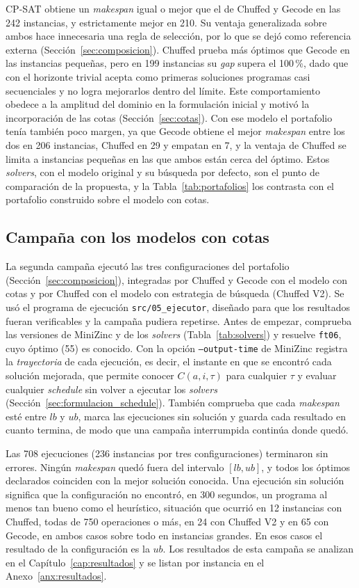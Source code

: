 CP-SAT obtiene un \textit{makespan} igual o mejor que el de Chuffed y Gecode en
las 242 instancias, y estrictamente mejor en 210. Su ventaja generalizada sobre
ambos hace innecesaria una regla de selección, por lo que se dejó como
referencia externa (Sección~\ref{sec:composicion}). Chuffed prueba más óptimos
que Gecode en las instancias pequeñas, pero en 199 instancias su \textit{gap}
supera el 100\,\%, dado que con el horizonte trivial acepta como primeras
soluciones programas casi secuenciales y no logra mejorarlos dentro del límite.
Este comportamiento obedece a la amplitud del dominio en la formulación inicial
y motivó la incorporación de las cotas (Sección~\ref{sec:cotas}). Con ese
modelo el portafolio tenía también poco margen, ya que Gecode obtiene el mejor
\textit{makespan} entre los dos en 206 instancias, Chuffed en 29 y empatan en 7,
y la ventaja de Chuffed se limita a instancias pequeñas en las que ambos están
cerca del óptimo.
Estos \textit{solvers}, con el modelo original y su búsqueda por defecto, son
el punto de comparación de la propuesta, y la Tabla~\ref{tab:portafolios} los
contrasta con el portafolio construido sobre el modelo con cotas.

\subsection{Campaña con los modelos con cotas}

La segunda campaña ejecutó las tres configuraciones del portafolio
(Sección~\ref{sec:composicion}), integradas por Chuffed y Gecode con el modelo
con cotas y por Chuffed con el modelo con estrategia de búsqueda (Chuffed V2).
Se usó el programa de ejecución \texttt{src/05\_ejecutor}, diseñado para que los
resultados fueran verificables y la campaña pudiera repetirse. Antes de
empezar, comprueba las versiones de MiniZinc y de los \textit{solvers}
(Tabla~\ref{tab:solvers}) y resuelve \texttt{ft06}, cuyo óptimo (55) es
conocido. Con la opción \texttt{--output-time} de MiniZinc registra la
\textit{trayectoria} de cada ejecución, es decir, el instante en que se
encontró cada solución mejorada, que permite conocer $C(a, i, \tau)$ para
cualquier $\tau$ y evaluar cualquier \textit{schedule} sin volver a ejecutar
los \textit{solvers} (Sección~\ref{sec:formulacion_schedule}). También
comprueba que cada \textit{makespan} esté entre $lb$ y $ub$, marca las
ejecuciones sin solución y guarda cada resultado en cuanto termina, de modo
que una campaña interrumpida continúa donde quedó.

Las 708 ejecuciones (236 instancias por tres configuraciones) terminaron sin
errores. Ningún \textit{makespan} quedó fuera del intervalo $[lb, ub]$, y
todos los óptimos declarados coinciden con la mejor solución conocida. Una
ejecución sin solución significa que la configuración no encontró, en 300
segundos, un programa al menos tan bueno como el heurístico, situación que
ocurrió en 12 instancias con Chuffed, todas de 750 operaciones o más, en 24 con
Chuffed V2 y en 65 con Gecode, en ambos casos sobre todo en instancias grandes.
En esos casos el resultado de la configuración es la $ub$. Los resultados de
esta campaña se analizan en el Capítulo~\ref{cap:resultados} y se listan por
instancia en el Anexo~\ref{anx:resultados}.

